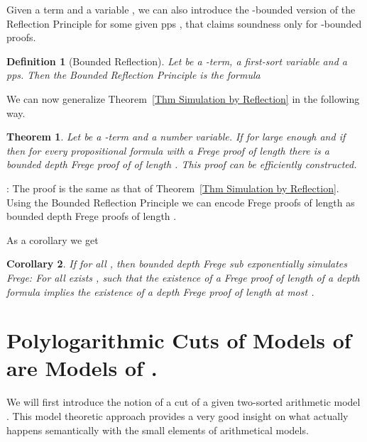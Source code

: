 \documentclass{LMCS}
\newtheorem{theorem}{Theorem}[section]
\newtheorem{corollary}[theorem]{Corollary}
\newtheorem{definition}{Definition}[section]
\newenvironment{proof}{\QuadSpace\par\noindent{\bf
Proof}:}{\EndProof\HalfSpace} \fi
\newcommand{\QuadSpace}{}\newcommand{\HalfSpace}{}\newcommand{\FullSpace}{}\newcommand{\EndProof}{ \hfill \vrule width 1ex height 1ex depth 0pt }
\newenvironment{proof}{

\smallskip
\noindent\emph{Proof.}}{\hfill
\bigskip
} \fi
\begin{document}
Given a term  and a variable , we can also introduce the  -bounded version of the Reflection Principle
for some given pps ,  that claims soundness only for -bounded proofs.

\begin{definition}
  [Bounded Reflection] Let  be a -term, 
  a first-sort variable and  a pps. Then the {\em Bounded
  Reflection Principle}  is the formula
  
\end{definition}



We can now generalize Theorem~\ref{Thm Simulation by Reflection} in the following way.

\begin{theorem}
  \label{Thm Simulation by Bounded Reflection}
  Let  be a -term and 
  a number variable. If  for  large enough
  and if  then for every
  propositional formula  with a Frege proof of length
   there is a bounded depth Frege proof of  of length
  . This proof can be efficiently constructed.
\end{theorem}

\begin{proof}
  The proof is the same as that of Theorem~\ref{Thm Simulation by
  Reflection}. Using the Bounded Reflection Principle we can encode
  Frege proofs of length  as bounded depth Frege proofs of length .
\end{proof}

As a corollary we get



\begin{corollary}
  If  for all , then
  bounded depth Frege sub exponentially simulates Frege:
  For all  exists , such that the existence of a Frege proof of length  of a depth  formula
  implies the existence of a depth  Frege proof of length at most .
\end{corollary}


\section{Polylogarithmic Cuts of Models of  are Models of .}\label{Sec:Polylog Cuts}

We will first introduce the notion of a cut  of a given two-sorted arithmetic model .
This model theoretic approach provides a very good insight on what actually happens semantically with the small
elements of arithmetical models.
\end{document}

